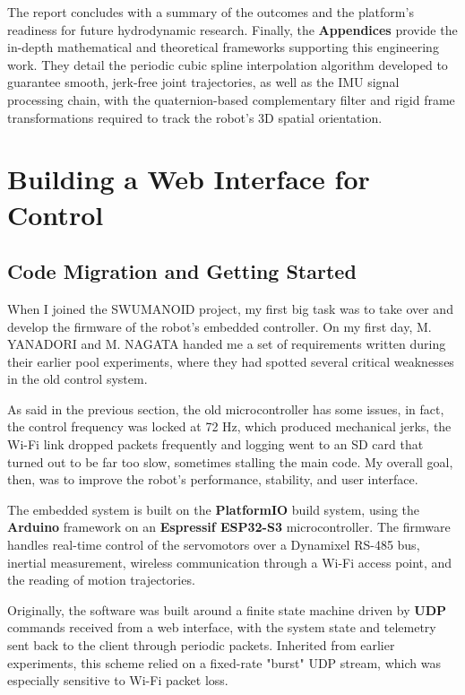 \documentclass{tropLaClasse}
\begin{document}
The report concludes with a summary of the outcomes and the platform's readiness for future hydrodynamic research. Finally, the \textbf{Appendices} provide the in-depth mathematical and theoretical frameworks supporting this engineering work. They detail the periodic cubic spline interpolation algorithm developed to guarantee smooth, jerk-free joint trajectories, as well as the IMU signal processing chain, with the quaternion-based complementary filter and rigid frame transformations required to track the robot's 3D spatial orientation.


\section{Building a Web Interface for Control}
\label{sec:web_interface_sec}
\subsection{Code Migration and Getting Started}

When I joined the SWUMANOID project, my first big task was to take over and develop the firmware of the robot's embedded controller. On my first day, M. YANADORI and M. NAGATA handed me a set of requirements written during their earlier pool experiments, where they had spotted several critical weaknesses in the old control system.

As said in the previous section, the old microcontroller has some issues, in fact, the control frequency was locked at 72 Hz, which produced mechanical jerks, the Wi-Fi link dropped packets frequently and logging went to an SD card that turned out to be far too slow, sometimes stalling the main code. My overall goal, then, was to improve the robot's performance, stability, and user interface.

The embedded system is built on the \textbf{PlatformIO} build system, using the \textbf{Arduino} framework on an \textbf{Espressif ESP32-S3} microcontroller. The firmware handles real-time control of the servomotors over a Dynamixel RS-485 bus, inertial measurement, wireless communication through a Wi-Fi access point, and the reading of motion trajectories.

Originally, the software was built around a finite state machine driven by \textbf{UDP} commands received from a web interface, with the system state and telemetry sent back to the client through periodic packets. Inherited from earlier experiments, this scheme relied on a fixed-rate "burst" UDP stream, which was especially sensitive to Wi-Fi packet loss.
\end{document}

